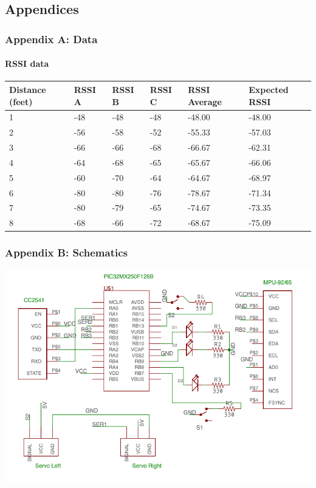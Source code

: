 \documentclass[]{article}
\let\oldparagraph\paragraph
\renewcommand{\paragraph}[1]{\oldparagraph{#1}\mbox{}}
\begin{document}
\hypertarget{appendices}{%
\subsection{Appendices}\label{appendices}}

\hypertarget{appendix-c-schematics}{%
\subsubsection{Appendix A: Data}\label{appendix-c-schematics}}

\hypertarget{rssi-data}{%
\paragraph{RSSI data}\label{rssi-data}}

\begin{longtable}[]{@{}llllll@{}}
\toprule
Distance (feet) & RSSI A & RSSI B & RSSI C & RSSI Average & Expected
RSSI\tabularnewline
\midrule
\endhead
1 & -48 & -48 & -48 & -48.00 & -48.00\tabularnewline
2 & -56 & -58 & -52 & -55.33 & -57.03\tabularnewline
3 & -66 & -66 & -68 & -66.67 & -62.31\tabularnewline
4 & -64 & -68 & -65 & -65.67 & -66.06\tabularnewline
5 & -60 & -70 & -64 & -64.67 & -68.97\tabularnewline
6 & -80 & -80 & -76 & -78.67 & -71.34\tabularnewline
7 & -80 & -79 & -65 & -74.67 & -73.35\tabularnewline
8 & -68 & -66 & -72 & -68.67 & -75.09\tabularnewline
\bottomrule
\end{longtable}

\hypertarget{appendix-c-schematics}{%
\subsubsection{Appendix B: Schematics}\label{appendix-c-schematics}}

\includegraphics{schematic.png}
\end{document}
